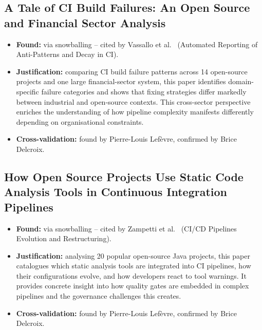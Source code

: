 \documentclass[a4paper,11pt,oneside]{article}
\begin{document}
\subsection{A Tale of CI Build Failures: An Open Source and Financial Sector Analysis \cite{Vassallo2017}}
%
\begin{itemize}
    \item \textbf{Found:} via snowballing -- cited by Vassallo et al.~\cite{Vassallo2019} (Automated Reporting of Anti-Patterns and Decay in CI).
    \item \textbf{Justification:} comparing CI build failure patterns across 14 open-source projects and one large financial-sector system, this paper identifies domain-specific failure categories and shows that fixing strategies differ markedly between industrial and open-source contexts. This cross-sector perspective enriches the understanding of how pipeline complexity manifests differently depending on organisational constraints.
    \item \textbf{Cross-validation:} found by Pierre-Louis Lef\`{e}vre, confirmed by Brice Delcroix.
\end{itemize}

\subsection{How Open Source Projects Use Static Code Analysis Tools in Continuous Integration Pipelines \cite{Zampetti2017}}
%
\begin{itemize}
    \item \textbf{Found:} via snowballing -- cited by Zampetti et al.~\cite{Zampetti2021} (CI/CD Pipelines Evolution and Restructuring).
    \item \textbf{Justification:} analysing 20 popular open-source Java projects, this paper catalogues which static analysis tools are integrated into CI pipelines, how their configurations evolve, and how developers react to tool warnings. It provides concrete insight into how quality gates are embedded in complex pipelines and the governance challenges this creates.
    \item \textbf{Cross-validation:} found by Pierre-Louis Lef\`{e}vre, confirmed by Brice Delcroix.
\end{itemize}

\end{document}
